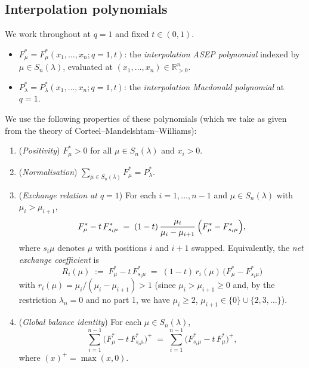 \documentclass[12pt]{article}
\theoremstyle{definition}
\theoremstyle{remark}
\begin{document}
\subsection{Interpolation polynomials}
We work throughout at $q=1$ and fixed $t\in(0,1)$.
\begin{itemize}
\item $F^*_\mu = F^*_\mu(x_1,\dots,x_n;q=1,t)$: the \emph{interpolation ASEP
  polynomial} indexed by $\mu\in S_n(\lambda)$, evaluated at
  $(x_1,\dots,x_n)\in\mathbb{R}_{>0}^n$.
\item $P^*_\lambda = P^*_\lambda(x_1,\dots,x_n;q=1,t)$: the
  \emph{interpolation Macdonald polynomial} at $q=1$.
\end{itemize}
We use the following properties of these polynomials (which we take as given
from the theory of Corteel--Mandelshtam--Williams):
\begin{enumerate}
\item[\textbf{(A1)}]
  (\emph{Positivity}) $F^*_\mu > 0$ for all $\mu \in S_n(\lambda)$ and
  $x_i > 0$.
\item[\textbf{(A2)}]
  (\emph{Normalisation}) $\sum_{\mu\in S_n(\lambda)} F^*_\mu = P^*_\lambda$.
\item[\textbf{(A3)}]
  (\emph{Exchange relation at $q=1$})
  For each $i = 1,\dots,n-1$ and $\mu\in S_n(\lambda)$ with
  $\mu_i > \mu_{i+1}$,
  \begin{equation}\label{eq:exchange}
    F^*_\mu - t\,F^*_{s_i\mu}
    \;=\;
    (1-t)\,\frac{\mu_i}{\mu_i - \mu_{i+1}}\,
    \Bigl(F^*_\mu - F^*_{s_i\mu}\Bigr),
  \end{equation}
  where $s_i\mu$ denotes $\mu$ with positions $i$ and $i+1$ swapped.
  Equivalently, the \emph{net exchange coefficient} is
  \begin{equation}\label{eq:Ri}
    R_i(\mu) \;:=\; F^*_\mu - t\,F^*_{s_i\mu}
    \;=\; (1-t)\,r_i(\mu)\,\bigl(F^*_\mu - F^*_{s_i\mu}\bigr)
  \end{equation}
  with $r_i(\mu) = \mu_i/(\mu_i-\mu_{i+1}) > 1$ (since $\mu_i > \mu_{i+1}
  \geq 0$ and, by the restriction $\lambda_n = 0$ and no part 1, we have
  $\mu_i \geq 2$, $\mu_{i+1}\in\{0\}\cup\{2,3,\dots\}$).
\item[\textbf{(A4)}]
  (\emph{Global balance identity}) For each $\mu\in S_n(\lambda)$,
  \begin{equation}\label{eq:globalbal}
    \sum_{i=1}^{n-1}
    \bigl(F^*_\mu - t\,F^*_{s_i\mu}\bigr)^{\!+}
    \;=\;
    \sum_{i=1}^{n-1}
    \bigl(F^*_{s_i\mu} - t\,F^*_\mu\bigr)^{\!+},
  \end{equation}
  where $(x)^+ = \max(x,0)$.
\end{enumerate}
\end{document}
